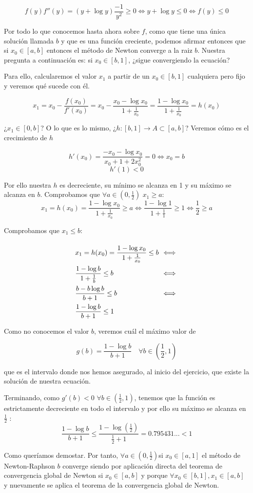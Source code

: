 \documentclass[11pt]{article}
\begin{document}
\begin{itemize}
\[
f(y)f''(y)=(y+\log y)\frac{-1}{y^2}\geq 0\iff y+\log y \leq 0 \iff f(y)\leq 0
\]

Por todo lo que conocemos hasta ahora sobre $f$, como que tiene una única solución llamada $b$ y que es una función creciente, podemos afirmar entonces que si $x_0\in[a,b]$ entonces el método de Newton converge a la raiz $b$. Nuestra pregunta a continuación es: si $x_0\in[b,1]$, ¿sigue convergiendo la ecuación?

Para ello, calcularemos el valor $x_1$ a partir de un $x_0\in[b,1]$ cualquiera pero fijo y veremos qué sucede con él.

\[
x_1=x_0-\frac{f(x_0)}{f'(x_0)}=x_0-\frac{x_0-\log x_0}{1+\frac{1}{x_0}}=\frac{1-\log x_0}{1+\frac{1}{x_0}}=h(x_0)
\]

¿$x_1\in[0,b]$? O lo que es lo mismo, ¿$h:[b,1]\rightarrow A \subset[a,b]$? Veremos cómo es el crecimiento de $h$

\[
h'(x_0)=\frac{-x_0-\log x_0}{x_0+1+2x_0^2}=0 \iff x_0=b\]\[
h'(1)<0
\]

Por ello nuestra $h$ es decreciente, su mínimo se alcanza en 1 y su máximo se alcanza en $b$. Comprobamos que $\forall a\in(0,\frac{1}{2})$ $ x_1 \ge a$:
\[
x_1=h(x_0)=\frac{1-\log x_0}{1+\frac{1}{x_0}}\ge a\iff \frac{1-\log 1}{1+\frac{1}{1}} \geq 1 \iff \frac{1}{2} \ge a 
\]

Comprobamos que $x_1\leq b$:

\[\arraycolsep=2pt\def\arraystretch{2.2}
\begin{array}{>{\displaystyle}ll}
  x_1=h(x_0)=\frac{1-\log x_0}{1+\frac{1}{x_0}}\leq b & \iff \\
  \frac{1-\log b}{1+\frac{1}{b}} \leq b & \iff \\
  \frac{b-b\log b}{b+1} \leq b & \iff \\
  \frac{1-\log b}{b+1} \leq 1
\end{array}
\]

Como no conocemos el valor $b$, veremos cuál el máximo valor de

\[g(b)=\frac{1-\log b}{b+1} \quad \forall b \in \left(\frac{1}{2},1\right)\]

que es el intervalo donde nos hemos asegurado, al inicio del ejercicio, que existe la solución de nuestra ecuación.

Terminando, como $g'(b)<0$ $\forall b \in \left(\frac{1}{2},1\right)$, tenemos que la función es estrictamente decreciente en todo el intervalo y por ello su máximo se alcanza en $\frac{1}{2}$ :
\[\frac{1-\log b}{b+1}\leq \frac{1-\log (\frac{1}{2})}{\frac{1}{2}+1}=0.795431... < 1\]

Como queríamos demostar. Por tanto, $\forall a\in(0,\frac{1}{2})$si $x_0\in[a,1]$ el método de Newton-Raphson $b$ converge siendo por aplicación directa del teorema de convergencia global de Newton si $x_0 \in [a,b]$ y porque $\forall x_0 \in [b,1], x_1\in [a,b]$ y nuevamente se aplica el teorema de la convergencia global de Newton.
\end{itemize}
\end{document}
